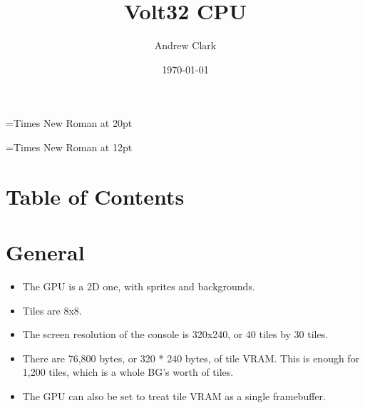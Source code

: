 \documentclass{article}
\makeatletter
\renewcommand\tableofcontents{%
    \@starttoc{toc}%
}
\makeatother
\begin{document}
	\font\titlefont={Times New Roman} at 20pt
	\title{{\titlefont Volt32 CPU}}

	\font\bottomtextfont={Times New Roman} at 12pt
	\date{{\bottomtextfont} \today}
	\author{{\bottomtextfont Andrew Clark}}

	\setmainfont{Times New Roman}
	\setmonofont{Courier New}

	\maketitle

	\newpage



\section{Table of Contents}
	\tableofcontents
	\newpage

\section{General}
	\begin{itemize}
	\item The GPU is a 2D one, with sprites and backgrounds.

	\item Tiles are 8x8.

	\item The screen resolution of the console is 320x240, or 40 tiles by
	30 tiles.

	\item There are 76,800 bytes, or 320 * 240 bytes, of tile VRAM.  This
	is enough for 1,200 tiles, which is a whole BG's worth of tiles.

	\item The GPU can also be set to treat tile VRAM as a single
	framebuffer.
	\end{itemize}
\end{document}
